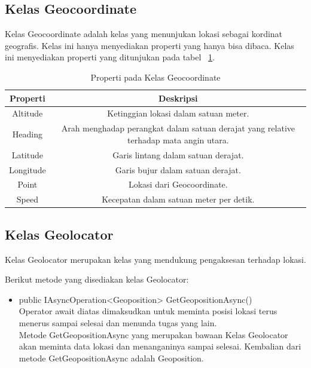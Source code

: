 \subsection{Kelas Geocoordinate}
\label{subsec:Kelas Geocoordinate}
\hspace{0.5cm} Kelas Geocoordinate adalah kelas yang menunjukan lokasi sebagai kordinat geografis. Kelas ini hanya menyediakan properti yang hanya bisa dibaca. Kelas ini menyediakan properti yang ditunjukan pada tabel ~\ref{tab:PropertiPadaKelasGeocoordinate}.

\begin{table}[h]
	\centering
		\begin{tabular}{ |c||c|}
				\hline
				Properti & Deskripsi \\ \hline
				Altitude & Ketinggian lokasi dalam satuan meter. \\ \hline
				Heading & Arah menghadap perangkat dalam satuan derajat yang relative terhadap mata angin utara. \\ \hline
				Latitude & Garis lintang dalam satuan derajat. \\ \hline
				Longitude  & Garis bujur dalam satuan derajat. \\ \hline
				Point & Lokasi dari Geocoordinate. \\ \hline
				Speed & Kecepatan dalam satuan meter per detik. \\ \hline
				\hline
		\end{tabular}
	\caption{Properti pada Kelas Geocoordinate}
	\label{tab:PropertiPadaKelasGeocoordinate}
\end{table} 

\subsection{Kelas Geolocator}
\label{subsec:Kelas Geolocator}
\hspace{0.5cm} Kelas Geolocator merupakan kelas yang mendukung pengaksesan terhadap lokasi.

Berikut metode yang disediakan kelas Geolocator:
\begin{itemize}
	\item public IAsyncOperation<Geoposition> GetGeopositionAsync() \\
		Operator await diatas dimaksudkan untuk meminta posisi lokasi terus menerus sampai selesai dan menunda tugas yang lain. \\
		Metode GetGeopositionAsync yang merupakan bawaan Kelas Geolocator akan meminta data lokasi dan menanganinya sampai selesai.
		Kembalian dari metode GetGeopositionAsync adalah Geoposition.
\end{itemize}

